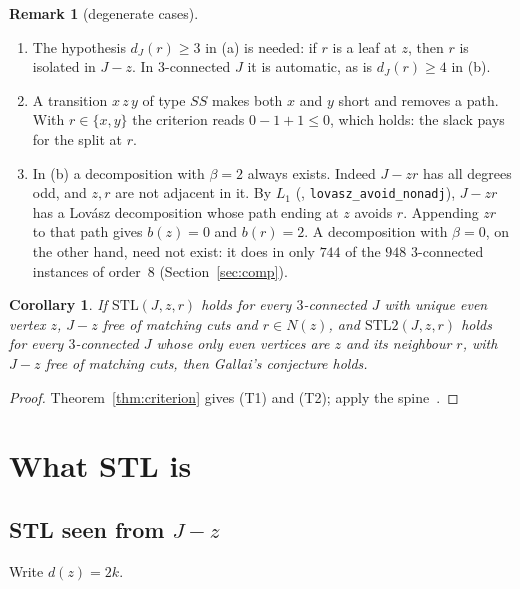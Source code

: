 \documentclass[11pt]{amsart}
\newtheorem{corollary}[theorem]{Corollary}
\theoremstyle{definition}
\newtheorem{remark}[theorem]{Remark}
\newcommand{\lean}[1]{\quad{\footnotesize[Lean: \texttt{#1}]}}
\newcommand{\STL}{\mathrm{STL}}
\begin{document}
\begin{remark}[degenerate cases]\label{rem:degenerate}
\begin{enumerate}[label=(\roman*)]
\item The hypothesis $d_J(r)\ge3$ in (a) is needed: if $r$ is a leaf at $z$, then $r$ is
isolated in $J-z$. In $3$-connected $J$ it is automatic, as is $d_J(r)\ge4$ in (b).
\item A transition $x\,z\,y$ of type $SS$ makes both $x$ and $y$ short and removes a path. With
$r\in\{x,y\}$ the criterion reads $0-1+1\le0$, which holds: the slack pays for the split at $r$.
\item In (b) a decomposition with $\beta=2$ always exists. Indeed $J-zr$ has all degrees odd,
and $z,r$ are not adjacent in it. By $L_1$ (\cite{RD},
\texttt{lovasz\_avoid\_nonadj}), $J-zr$ has a Lov\'asz decomposition whose path ending at $z$
avoids $r$. Appending $zr$ to that path gives $b(z)=0$ and $b(r)=2$. A decomposition with
$\beta=0$, on the other hand, need not exist: it does in only $744$ of the $948$ $3$-connected
instances of order~$8$ (Section~\ref{sec:comp}).
\end{enumerate}
\end{remark}

\begin{corollary}\label{cor:gallai}
If $\STL(J,z,r)$ holds for every $3$-connected $J$ with unique even vertex $z$, $J-z$ free of
matching cuts and $r\in N(z)$, and $\STL2(J,z,r)$ holds for every $3$-connected $J$ whose only even
vertices are $z$ and its neighbour $r$, with $J-z$ free of matching cuts, then Gallai's conjecture
holds.\lean{gallai\_of\_stl}
\end{corollary}

\begin{proof}
Theorem~\ref{thm:criterion} gives (T1) and (T2); apply the spine~\cite{SP}.
\end{proof}

\section{What STL is}\label{sec:strength}

\subsection{STL seen from \texorpdfstring{$J-z$}{J-z}}
Write $d(z)=2k$.
\end{document}
